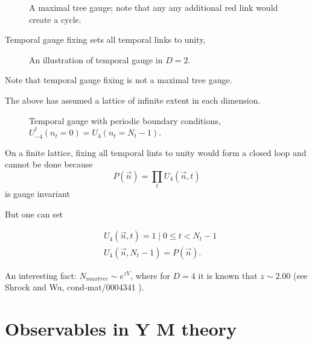 \begin{figure}
\caption{A maximal tree gauge; note that any any additional red link would create a cycle.
\label{fig:maximal_tree_gauge}
}
\end{figure}

Temporal gauge fixing sets all temporal links to unity,
\begin{figure}
\caption{An illustration of temporal gauge in $D=2$.}
\end{figure}
Note that temporal gauge fixing is not a maximal tree gauge.

The above has assumed a lattice of infinite extent in each dimension.
\begin{figure}
\caption{Temporal gauge with periodic boundary conditions, $U_{-4}^{\dagger}\left(n_{t}=0\right)=U_{4}\left(n_{t}=N_{t}-1\right)$.
}
\end{figure}


On a finite lattice, fixing all temporal lints to unity would form a closed loop and cannot be done because 
\begin{equation}
P(\vec{n})=\prod_{t} U_{4}(\vec{n}, t)
\end{equation}
is gauge invariant 

But one can set

\begin{equation}
\begin{aligned}
& U_{4}(\vec{n}, t)=1 \mid 0 \leqslant t<N_{t}-1 \\
& U_{4}\left(\vec{n}, N_{t}-1\right)=P(\vec{n}).
\end{aligned}
\end{equation}

An interesting fact: $N_{max tree}\sim e^{zV}$, where for $D=4$ it is known that $z \sim 2.00$ (see Shrock and Wu, cond-mat/0004341 ).

\section{Observables in Y M theory}

